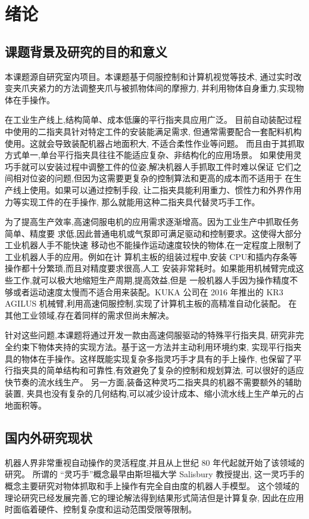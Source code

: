 \chapter{绪论}

\section{课题背景及研究的目的和意义}
本课题源自研究室内项目。本课题基于伺服控制和计算机视觉等技术,
通过实时改变夹爪夹紧力的方法调整夹爪与被抓物体间的摩擦力,
并利用物体自身重力,实现物体在手操作。

在工业生产线上,结构简单、成本低廉的平行指夹具应用广泛。
目前自动装配过程中使用的二指夹具针对特定工件的安装能满足需求,
但通常需要配合一套配料机构使用。这就会导致装配机器占地面积大,
不适合柔性作业等问题。
而且由于其抓取方式单一,单台平行指夹具往往不能适应复杂、非结构化的应用场景。
如果使用灵巧手就可以安装过程中调整工件的位姿,解决机器人手抓取工件时难以保证
它们之间相对位姿的问题,但因为这需要更复杂的控制算法和更高的成本而不适用于
在生产线上使用。如果可以通过控制手段,
让二指夹具能利用重力、惯性力和外界作用力等实现工件的在手操作,
那么就能用这种二指夹具代替灵巧手工作。

为了提高生产效率,高速伺服电机的应用需求逐渐增高。因为工业生产中抓取任务简单、精度要
求低,因此普通电机或气泵即可满足驱动和控制要求。这使得大部分工业机器人手不能快速
移动也不能操作运动速度较快的物体,在一定程度上限制了工业机器人手的应用。例如在计
算机主板的组装过程中,安装 CPU和插内存条等操作都十分繁琐,而且对精度要求很高,人工
安装非常耗时。如果能用机械臂完成这些工作,就可以极大地缩短生产周期,提高效益,但是
一般机器人手因为操作精度不够或者运动速度太慢而不适合用来装配。KUKA 公司在 2016
年推出的 KR3 AGILUS 机械臂,利用高速伺服控制,实现了计算机主板的高精准自动化装配。
在其他工业领域,存在着同样的需求但尚未解决。

针对这些问题,本课题将通过开发一款由高速伺服驱动的特殊平行指夹具,
研究非完全约束下物体夹持的实现方法。基于这一方法并主动利用环境约束,
实现平行指夹具的物体在手操作。这样既能实现复杂多指灵巧手才具有的手上操作,
也保留了平行指夹具的简单结构和可靠性,有效避免了复杂的控制和规划算法,
可以很好的适应快节奏的流水线生产。
另一方面,装备这种灵巧二指夹具的机器不需要额外的辅助装置,
夹具也没有复杂的几何结构,可以减少设计成本、缩小流水线上生产单元的占地面积等。

\section{国内外研究现状}
机器人界非常重视自动操作的灵活程度,并且从上世纪 80 年代起就开始了该领域的研究。
所谓的 “灵巧手”概念最早由斯坦福大学 Salisbury 教授提出,
这一灵巧手的概念主要研究对物体抓取和手上操作有完全自由度的机器人手模型。
这个领域的理论研究已经发展完善,它的理论解法得到结果形式简洁但是计算复杂,
因此在应用时面临着硬件、控制复杂度和运动范围受限等限制\cite{ref1}。

